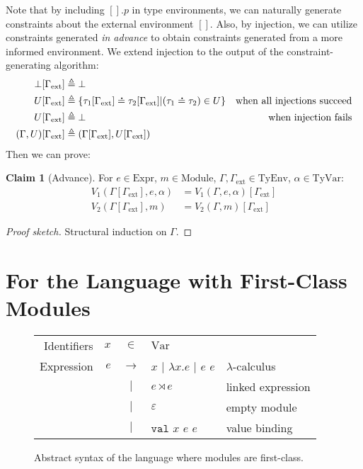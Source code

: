 \documentclass{article}
\theoremstyle{definition}
\newtheorem{clm}{Claim}[section]
\newcommand*{\vbar}{|}
\newcommand*{\A}[1]{\overset{\,_{\mbox{\Large .}}}{#1}}
\newcommand*{\Expr}{\text{Expr}}
\newcommand*{\ExprVar}{\text{Var}}
\newcommand*{\Module}{\text{Module}}
\newcommand*{\link}[2]{{#1}\rtimes{#2}}
\newcommand*{\Lete}{\mathtt{val}}
\newcommand*{\TyEnv}{\text{TyEnv}}
\newcommand*{\TyVar}{\text{TyVar}}
\newcommand*{\external}{\Gamma_{\text{ext}}}
\begin{document}
Note that by including $[].p$ in type environments, we can naturally generate constraints about the external environment $[]$.
Also, by injection, we can utilize constraints generated \emph{in advance} to obtain constraints generated from a more informed environment.
We extend injection to the output of the constraint-generating algorithm:
\begin{align*}
	\bot[\external]       & \triangleq\bot                                                                                                      \\
	U[\external]          & \triangleq\{\tau_1[\external]\A{=}\tau_2[\external]|(\tau_1\A{=}\tau_2)\in U\} & \text{when all injections succeed} \\
	U[\external]          & \triangleq\bot                                                                 & \text{when injection fails}        \\
	(\Gamma,U)[\external] & \triangleq(\Gamma[\external],U[\external])
\end{align*}
Then we can prove:
\begin{clm}[Advance]
	For $e\in\Expr$, $m\in\Module$, $\Gamma,\external\in\TyEnv$, $\alpha\in\TyVar$:
	\begin{align*}
		V_1(\Gamma[\external],e,\alpha) & =V_1(\Gamma,e,\alpha)[\external] \\
		V_2(\Gamma[\external],m)        & =V_2(\Gamma,m)[\external]
	\end{align*}
\end{clm}
\begin{proof}[Proof sketch]
	Structural induction on $\Gamma$.
\end{proof}

\section{For the Language with First-Class Modules}
\begin{figure}[htb]
	\centering
	\begin{tabular}{rrcll}
		Identifiers & $x$ & $\in$         & $\ExprVar$                                                     \\
		Expression  & $e$ & $\rightarrow$ & $x$ $\vbar$ $\lambda x.e$ $\vbar$ $e$ $e$ & $\lambda$-calculus \\
		            &     & $\vbar$       & $\link{e}{e}$                             & linked expression  \\
		            &     & $\vbar$       & $\varepsilon$                             & empty module       \\
		            &     & $\vbar$       & $\Lete$ $x$ $e$ $e$                       & value binding
	\end{tabular}
	\caption{Abstract syntax of the language where modules are first-class.}
	\label{fig:extsyntax}
\end{figure}
\end{document}
